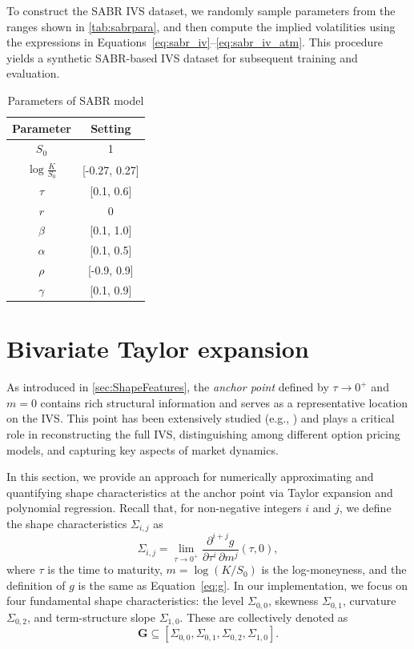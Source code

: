 \documentclass{article}
\begin{document}
{To construct the SABR IVS dataset, we randomly sample parameters from the ranges shown in \autoref{tab:sabrpara}, and then compute the implied volatilities using the expressions in Equations~\eqref{eq:sabr_iv}–\eqref{eq:sabr_iv_atm}. This procedure yields a synthetic SABR-based IVS dataset for subsequent training and evaluation.
\begin{table}[htpb]
    \centering
    \caption{Parameters of SABR model}
    \begin{tabular}{cc}
    \toprule
Parameter & Setting        \\
\midrule
$S_0$     & 1              \\
$\log \frac{K}{S_0}$  & [-0.27, 0.27]     \\
$\tau$       & [0.1, 0.6]     \\
$r$       & 0              \\
$\beta$   & [0.1, 1.0]     \\
$\alpha$  & [0.1, 0.5]     \\
$\rho$    & [-0.9, 0.9]    \\
$\gamma$  & [0.1, 0.9]     \\
\bottomrule
\end{tabular}
\label{tab:sabrpara}
\end{table}


\section{Bivariate Taylor expansion}
\label{sec:anchor}

As introduced in \autoref{sec:ShapeFeatures}, the \textit{anchor point} defined by \( \tau \rightarrow 0^+ \) and \( m = 0 \) contains rich structural information and serves as a representative location on the IVS. This point has been extensively studied (e.g., \cite{ait2021implied, alos2021malliavin}) and plays a critical role in reconstructing the full IVS, distinguishing among different option pricing models, and capturing key aspects of market dynamics.

In this section, we provide an approach for numerically approximating and quantifying shape characteristics at the anchor point via Taylor expansion and polynomial regression. Recall that, for non-negative integers \( i \) and \( j \), we define the shape characteristics \( \Sigma_{i,j} \) as
\begin{equation}
    \Sigma_{i,j} = \lim_{\tau \rightarrow 0^+} \frac{\partial^{i+j} g}{\partial \tau^i\, \partial m^j}(\tau, 0),
\end{equation}
where \( \tau \) is the time to maturity, \( m = \log(K/S_0) \) is the log-moneyness, and the definition of $g$ is the same as Equation~\eqref{eq:g}. In our implementation, we focus on four fundamental shape characteristics: the level \( \Sigma_{0,0} \), skewness \( \Sigma_{0,1} \), curvature \( \Sigma_{0,2} \), and term-structure slope \( \Sigma_{1,0} \). These are collectively denoted as
\[
\mathbf{G} \subseteq [\Sigma_{0,0}, \Sigma_{0,1}, \Sigma_{0,2}, \Sigma_{1,0}].
\]

}
\end{document}
